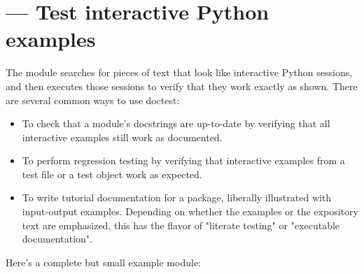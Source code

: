 \section{ ---
         Test interactive Python examples}



The  module searches for pieces of text that look like
interactive Python sessions, and then executes those sessions to
verify that they work exactly as shown.  There are several common ways to
use doctest:

\begin{itemize}
\item To check that a module's docstrings are up-to-date by verifying
      that all interactive examples still work as documented.
\item To perform regression testing by verifying that interactive
      examples from a test file or a test object work as expected.
\item To write tutorial documentation for a package, liberally
      illustrated with input-output examples.  Depending on whether
      the examples or the expository text are emphasized, this has
      the flavor of "literate testing" or "executable documentation".
\end{itemize}

Here's a complete but small example module:

